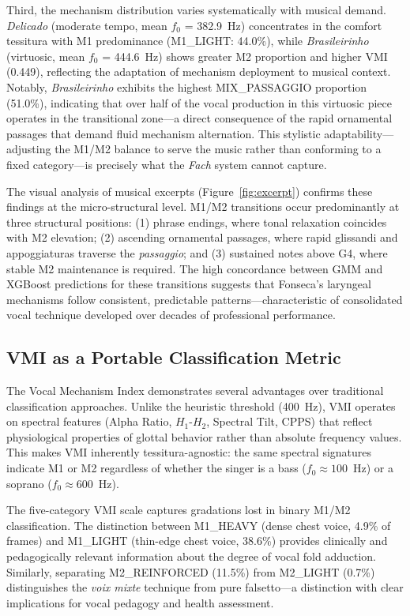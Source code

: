 \documentclass[review,3p,number]{elsarticle}
\begin{document}
Third, the mechanism distribution varies systematically with musical demand.
\emph{Delicado} (moderate tempo, mean $f_0$ = 382.9~Hz) concentrates in the comfort
tessitura with M1 predominance (M1\_LIGHT: 44.0\%), while \emph{Brasileirinho}
(virtuosic, mean $f_0$ = 444.6~Hz) shows greater M2 proportion and higher VMI (0.449),
reflecting the adaptation of mechanism deployment to musical context. Notably,
\emph{Brasileirinho} exhibits the highest MIX\_PASSAGGIO proportion (51.0\%),
indicating that over half of the vocal production in this virtuosic piece operates in
the transitional zone---a direct consequence of the rapid ornamental passages that
demand fluid mechanism alternation. This stylistic adaptability---adjusting the
M1/M2 balance to serve the music rather than conforming to a fixed
category---is precisely what the \emph{Fach} system cannot capture.

The visual analysis of musical excerpts (Figure~\ref{fig:excerpt}) confirms these
findings at the micro-structural level. M1/M2 transitions occur predominantly at
three structural positions: (1) phrase endings, where tonal relaxation coincides with
M2 elevation; (2) ascending ornamental passages, where rapid glissandi and
appoggiaturas traverse the \emph{passaggio}; and (3) sustained notes above G4, where
stable M2 maintenance is required. The high concordance between GMM and XGBoost
predictions for these transitions suggests that Fonseca's laryngeal mechanisms follow
consistent, predictable patterns---characteristic of consolidated vocal technique
developed over decades of professional performance.

\subsection{VMI as a Portable Classification Metric}
\label{sec:vmi_discussion}

The Vocal Mechanism Index demonstrates several advantages over traditional
classification approaches. Unlike the heuristic threshold (400~Hz), VMI operates on
spectral features (Alpha Ratio, $H_1$-$H_2$, Spectral Tilt, CPPS) that reflect
physiological properties of glottal behavior rather than absolute frequency values.
This makes VMI inherently tessitura-agnostic: the same spectral signatures indicate
M1 or M2 regardless of whether the singer is a bass ($f_0 \approx 100$~Hz) or a
soprano ($f_0 \approx 600$~Hz).

The five-category VMI scale captures gradations lost in binary M1/M2 classification.
The distinction between M1\_HEAVY (dense chest voice, 4.9\% of frames) and M1\_LIGHT
(thin-edge chest voice, 38.6\%) provides clinically and pedagogically relevant
information about the degree of vocal fold adduction. Similarly, separating
M2\_REINFORCED (11.5\%) from M2\_LIGHT (0.7\%) distinguishes the \emph{voix mixte}
technique from pure falsetto---a distinction with clear implications for vocal
pedagogy and health assessment.
\end{document}
